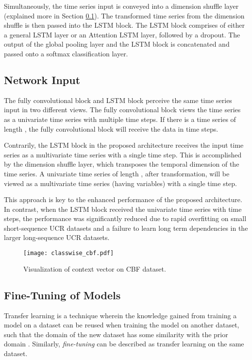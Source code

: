 \documentclass[article]{IEEEtran}
\begin{document}
Simultaneously, the time series input is conveyed into a dimension shuffle layer (explained more in Section \ref{net_input}). The transformed time series from the dimension shuffle is then passed into the LSTM block. The LSTM block comprises of either a general LSTM layer or an Attention LSTM layer, followed by a dropout. The output of the global pooling layer and the LSTM block is concatenated and passed onto a softmax classification layer.
 
\subsection{Network Input}
\label{net_input}
The fully convolutional block and LSTM block perceive the same time series input in two different views. The fully convolutional block views the time series as a univariate time series with multiple time steps. If there is a time series of length , the fully convolutional block will receive the data in  time steps. 

Contrarily, the LSTM block in the proposed architecture receives the input time series as a multivariate time series with a single time step. This is accomplished by the dimension shuffle layer, which transposes the temporal dimension of the time series. A univariate time series of length , after transformation, will be viewed as a multivariate time series (having  variables) with a single time step. 

This approach is key to the enhanced performance of the proposed architecture. In contrast, when the LSTM block received the univariate time series with  time steps, the performance was significantly reduced due to rapid overfitting on small short-sequence UCR datasets and a failure to learn long term dependencies in the larger long-sequence UCR datasets.  
\begin{figure*}
\center
\texttt{[image: classwise\_cbf.pdf]}
\caption{Visualization of context vector on CBF dataset.}
\label{fig:attention_cbf}
\center
\end{figure*}

\subsection{Fine-Tuning of Models}
Transfer learning is a technique wherein the knowledge gained from training a model on a dataset can be reused when training the model on another dataset, such that the domain of the new dataset has some similarity with the prior domain \cite{yosinski2014transferable}. Similarly, \textit{fine-tuning} can be described as transfer learning on the same dataset.
\end{document}
